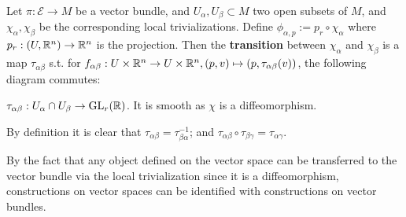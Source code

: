 \documentclass{article}
\begin{document}
\begin{definition}[Transition]
    Let $\pi: \mathcal{E} \to M$ be a vector bundle, and $U_{\alpha}, U_{\beta} \subset M$ two open subsets of $M$, and $\chi_{\alpha}, \chi_{\beta}$ be the corresponding local trivializations. Define $\phi_{\alpha, p} := p_r \circ \chi_{\alpha}$ where $p_r: (U, \mathbb{R}^n) \to \mathbb{R}^n$ is the projection. Then the \textbf{transition} between $\chi_{\alpha}$ and $\chi_\beta$ is a map $\tau_{\alpha \beta}$ s.t. for $f_{\alpha\beta}: U \times \mathbb{R}^n \to U \times \mathbb{R}^n, (p, v) \mapsto (p, \tau_{\alpha \beta}(v))$, the following diagram commutes:

    \begin{minipage}{\linewidth}
        \centering
    \end{minipage}
\end{definition}

\begin{observation}
    $\tau_{\alpha \beta}: U_{\alpha} \cap U_{\beta} \to \mathrm{GL}_r(\mathbb{R})$. It is smooth as $\chi$ is a diffeomorphism.
\end{observation}

\begin{remark}
    By definition it is clear that $\tau_{\alpha \beta} = \tau_{\beta \alpha}^{-1}$; and $\tau_{\alpha \beta} \circ \tau_{\beta \gamma} = \tau_{\alpha \gamma}$.
\end{remark}

\begin{observation}
    By the fact that any object defined on the vector space can be transferred to the vector bundle via the local trivialization since it is a diffeomorphism, constructions on vector spaces can be identified with constructions on vector bundles. 
\end{observation}
\end{document}

